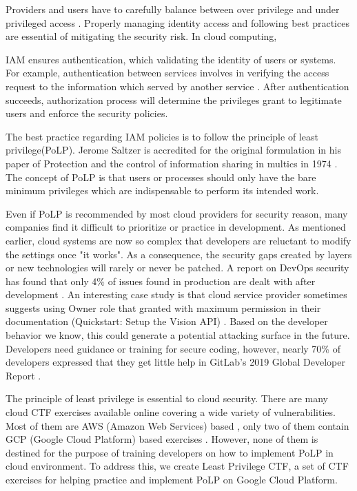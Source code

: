\documentclass[a4paper,twoside]{article}
\begin{document}
Providers and users have to carefully balance between over privilege and under privileged access \cite{Sanders2018}. Properly managing identity access and following best practices are essential of mitigating the security risk. 
In cloud computing, 

IAM ensures authentication, which validating the identity of users or systems. For example, authentication between services involves in verifying the access request to the information which served by another service \cite{AlmullaSameeraAbdulrahmanandYeun2010}.
After authentication succeeds, authorization process will determine the privileges grant to legitimate users and enforce the security policies.


The best practice regarding IAM policies is to follow the principle of least privilege(PoLP). Jerome Saltzer is accredited for the original formulation in  his paper of  Protection and the control of information sharing in multics in 1974 \cite{Saltzer1974}. The concept of PoLP is that users or processes should only have the bare minimum privileges which are indispensable to perform its intended work.

Even if PoLP is recommended by most cloud providers for security reason, many companies find it difficult to prioritize or practice in development. 
As mentioned earlier, cloud systems are now so complex that developers are reluctant to modify the settings once "it works". As a consequence, the security gaps created by layers or new technologies will rarely or never be patched. A report on DevOps security has found that only 4\% of issues found in production are dealt with after development \cite{Foremski}. 
An interesting case study is that cloud service provider sometimes suggests using Owner role that granted with maximum permission in their documentation (Quickstart: Setup the Vision API) \cite{GoogleVis}. Based on the developer behavior we know, this could generate a potential attacking surface in the future.
Developers need guidance or training for secure coding, however, nearly 70\% of developers expressed that they get little help in GitLab's 2019 Global Developer Report  \cite{Gitlab2019}.

The principle of least privilege is essential to cloud security. There are many cloud CTF exercises available online covering a wide variety of vulnerabilities. Most of them are AWS (Amazon Web Services) based \cite{flaws} \cite{flaws2} \cite{cloudgoat} \cite{serverlessgoat}, only two of them contain  GCP (Google Cloud Platform) based exercises \cite{thunder-ctf} \cite{QWIKLABS}.  However, none of them is destined for the purpose of training developers on how to implement PoLP in cloud environment. To address this, we create Least Privilege CTF, a set of CTF exercises for helping practice and implement PoLP on Google Cloud Platform.
\end{document}
